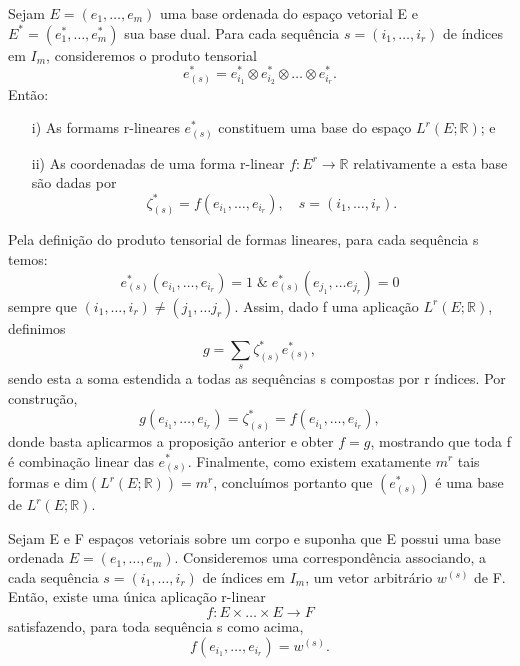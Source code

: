 \documentclass[../differential_forms.tex]{subfiles}
\begin{document}
\begin{prop*}
  Sejam \(E=(e_1,\dotsc ,e_{m})\) uma base ordenada do espaço vetorial E e \(E^{*}=(e_{1}^{*}, \dotsc , e_{m}^{*})\) sua base dual. Para cada sequência \(s=(i_1,\dotsc ,i_{r})\) de índices em \(I_{m}\), consideremos o produto tensorial 
    \[
      e_{(s)}^{*}=e_{i_1}^{*}\otimes e_{i_2}^{*}\otimes \dotsc \otimes e_{i_r}^{*}.
    \]
    Então:
   \begin{itemize}
     \item[i)] As formams r-lineares \(e_{(s)}^{*}\) constituem uma base do espaço \(L^{r}(E; \mathbb{R})\); e 
       \item[ii)] As coordenadas de uma forma r-linear \(f:E^{r}\rightarrow \mathbb{R}\) relativamente a esta base são dadas por 
         \[
           \zeta_{(s)}^{*}= f(e_{i_1}, \dotsc , e_{i_r}), \quad s=(i_1,\dotsc ,i_{r}).
         \]
   \end{itemize}
\end{prop*}
\begin{proof*}
  Pela definição do produto tensorial de formas lineares, para cada sequência s temos: 
    \[
      e_{(s)}^{*}(e_{i_1},\dotsc , e_{i_{r}})=1 \;\&\; e_{(s)}^{*}(e_{j_1},\dotsc e_{j_r})=0
    \]
    sempre que \((i_1,\dotsc ,i_{r})\neq (j_1,\dotsc j _{r})\). Assim, dado f uma aplicação \(L^{r}(E; \mathbb{R})\), definimos 
      \[
        g = \sum\limits_{s}^{}\zeta_{(s)}^{*}e_{(s)}^{*},
      \]
      sendo esta a soma estendida a todas as sequências s compostas por r índices. Por construção, 
        \[
          g(e_{i_1},\dotsc , e_{i_r}) = \zeta_{(s)}^{*}=f(e_{i_1},\dotsc , e_{i_r}),
        \]
        donde basta aplicarmos a proposição anterior e obter \(f=g\), mostrando que toda f é combinação linear das \(e_{(s)}^{*}.\) Finalmente, como existem exatamente \(m^{r}\) tais formas e \(\mathrm{dim}(L^{r}(E; \mathbb{R}))=m^{r}\), concluímos portanto que \((e_{(s)}^{*})\) é uma base de \(L^{r}(E; \mathbb{R})\). \qedsymbol
\end{proof*}
\begin{prop*}
  Sejam E e F espaços vetoriais sobre um corpo e suponha que E possui uma base ordenada \(E=(e_1,\dotsc , e_{m})\). Consideremos uma correspondência associando, a cada sequência \(s=(i_1,\dotsc ,i_r)\) de índices em \(I_{m}\), um vetor arbitrário \(w^{(s)}\) de F. Então, existe uma única aplicação r-linear 
    \[
      f:E\times \dotsc \times E\rightarrow F
    \]
    satisfazendo, para toda sequência s como acima, 
      \[
        f(e_{i_1}, \dotsc , e_{i_r})=w^{(s)}.
      \]
\end{prop*}
\end{document}
